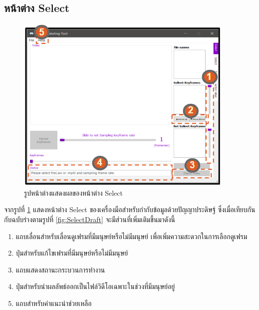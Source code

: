 \subsection*{หน้าต่าง Select}
\begin{figure}[!ht]
  \centering
    \includegraphics[scale=1.2]{chapter4/images/New_Final_ui/Select.png}
    \caption{รูปหน้าต่างแสดงผลของหน้าต่าง Select}
    \label{fig:final_select}
\end{figure}
จากรูปที่ \ref{fig:final_select} แสดงหน้าต่าง Select ของเครื่องมือสำหรับกำกับข้อมูลด้วยปัญญาประดิษฐ์ ซึ่งเมื่อเทียบกันกับฉบับร่างตามรูปที่ \ref{fig:SelectDraft} จะมีส่วนที่เพิ่มเติมขึ้นมาดังนี้
\begin{enumerate}
	\item แถบเลื่อนสำหรับเลื่อนดูเฟรมที่มีมนุษย์หรือไม่มีมนุษย์ เพื่อเพิ่มความสะดวกในการเลือกดูเฟรม
	\item ปุ่มสำหรับแก้ไขเฟรมที่มีมนุษย์หรือไม่มีมนุษย์
	\item แถบแสดงสถานะกระบวนการทำงาน
	\item ปุ่มสำหรับนำผลลัพธ์ออกเป็นไฟล์วิดีโอเฉพาะในช่วงที่มีมนุษย์อยู่
	\item แถบสำหรับคำแนะนำช่วยเหลือ
\end{enumerate}		

\clearpage
